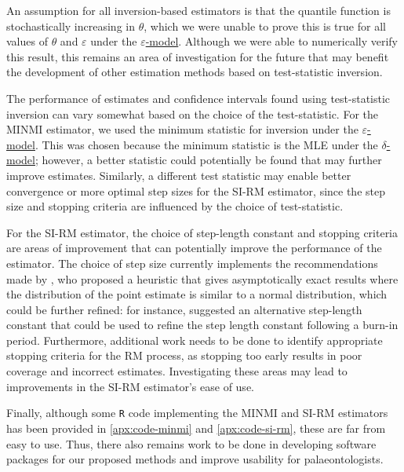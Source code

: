 An assumption for all inversion-based estimators is that the quantile function is stochastically increasing in $\theta$, which we were unable to prove this is true for all values of $\theta$ and $\varepsilon$ under the \hyperref[model: measurement-error]{$\varepsilon$-model}. Although we were able to numerically verify this result, this remains an area of investigation for the future that may benefit the development of other estimation methods based on test-statistic inversion.

The performance of estimates and confidence intervals found using test-statistic inversion can vary somewhat based on the choice of the test-statistic. For the MINMI estimator, we used the minimum statistic for inversion under the \hyperref[model: measurement-error]{$\varepsilon$-model}. This was chosen because the minimum statistic is the MLE under the \hyperref[model: no-measurement-error]{$\delta$-model}; however, a better statistic could potentially be found that may further improve estimates. Similarly, a different test statistic may enable better convergence or more optimal step sizes for the SI-RM estimator, since the step size and stopping criteria are influenced by the choice of test-statistic.

For the SI-RM estimator, the choice of step-length constant and stopping criteria are areas of improvement that can potentially improve the performance of the estimator. The choice of step size currently implements the recommendations made by \citet{Garthwaite1992}, who proposed a heuristic that gives asymptotically exact results where the distribution of the point estimate is similar to a normal distribution, which could be further refined: for instance, \citet{LlyodBotev2015} suggested an alternative step-length constant that could be used to refine the step length constant following a burn-in period. Furthermore, additional work needs to be done to identify appropriate stopping criteria for the RM process, as stopping too early results in poor coverage and incorrect estimates. Investigating these areas may lead to improvements in the SI-RM estimator's ease of use.

Finally, although some \texttt{R} code implementing the MINMI and SI-RM estimators has been provided in \autoref{apx:code-minmi} and \autoref{apx:code-si-rm}, these are far from easy to use. Thus, there also remains work to be done in developing software packages for our proposed methods and improve usability for palaeontologists.
